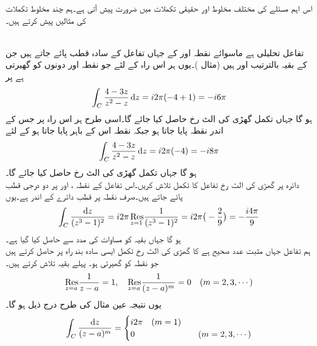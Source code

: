 اس اہم مسئلے کی مختلف مخلوط اور حقیقی تکملات  میں ضرورت پیش آتی ہے۔ہم چند مخلوط تکملات کی مثالیں پیش کرتے ہیں۔

\quad {}\\
تفاعل  تحلیلی ہے  ماسوائے نقطہ  اور  کے جہاں تفاعل کے سادہ قطب پائے جاتے ہیں جن کے بقیہ بالترتیب  اور  ہیں (مثال )۔یوں ہر اس راہ  کے لئے جو نقطہ  اور  دونوں کو گھیرتی ہے پر 
\begin{align*}
\int_C \frac{4-3z}{z^2-z}\dif z=i2\pi(-4+1)=-i6\pi
\end{align*} 
ہو گا جہاں تکمل گھڑی کی الٹ رخ حاصل کیا جائے گا۔اسی طرح ہر اس راہ  پر جس کے اندر نقطہ  پایا جاتا ہو جبکہ نقطہ  اس کے باہر پایا جاتا ہو کے لئے
\begin{align*}
\int_C \frac{4-3z}{z^2-z}\dif z=i2\pi(-4)=-i8\pi
\end{align*} 
ہو گا جہاں تکمل گھڑی کی الٹ رخ حاصل کیا جائے گا۔
\quad {}\\
دائرہ  پر گھڑی کی الٹ رخ تفاعل  کا تکمل تلاش کریں۔اس تفاعل کے نقطہ ،  اور  پر دو درجی قطب پائے جاتے ہیں۔صرف نقطہ  پر قطب دائرے کے اندر ہے۔یوں
\begin{align*}
\int_C \frac{\dif z}{(z^3-1)^2}=i2\pi \,\underset{z=1\hfill}{\Res} \frac{1}{(z^3-1)^2}=i2\pi\big(-\frac{2}{9}\big)=-\frac{i4\pi}{9}
\end{align*}
ہو گا جہاں بقیہ کو مساوات  کی مدد سے حاصل کیا گیا ہے۔
\quad {}\\
ہم تفاعل  جہاں  مثبت عدد صحیح ہے کا گھڑی کی الٹ رخ تکمل ایسی سادہ بند راہ   پر حاصل کرتے ہیں جو نقطہ  کو گھیرتی ہو۔ پہلے بقیہ تلاش کرتے ہیں۔
\begin{align*}
\underset{z=a\hfill}{\Res} \frac{1}{z-a}=1,\quad \underset{z=a\hfill}{\Res} \frac{1}{(z-a)^m}=0 \quad (m=2,3,\cdots)
\end{align*}
یوں نتیجہ  عین مثال  کی طرح درج ذیل ہو گا۔
\begin{align*}
\int_C \frac{\dif z}{(z-a)^m}=
\begin{cases}
i2\pi \quad (m=1)\\
0&\quad (m=2,3,\cdots)
\end{cases}
\end{align*}

